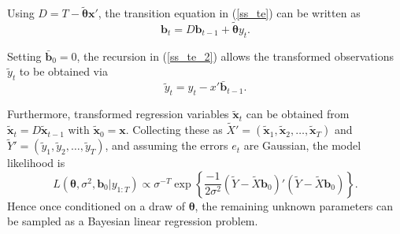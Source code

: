 \documentclass[12pt,a4paper]{article}%
\numberwithin{equation}{section}
\begin{document}
Using $D = T - \tilde{\boldsymbol{\theta}} \textbf{x}'$, the transition equation in (\ref{ss_te}) can be written as 
\begin{equation}
\textbf{b}_t = D \textbf{b}_{t-1} + \tilde{\boldsymbol{\theta}} y_t \label{ss_te_2}.
\end{equation}

Setting $\bar{\textbf{b}}_0 = 0$, the recursion in (\ref{ss_te_2}) allows the transformed observations $\tilde{y}_t$ to be obtained via
\begin{equation}
\tilde{y}_t = y_t - x'\bar{\textbf{b}}_{t-1} \label{ss_rp_y}.
\end{equation}

Furthermore, transformed regression variables $\tilde{\textbf{x}}_t$ can be obtained from $\tilde{\textbf{x}}_t = D\tilde{\textbf{x}}_{t-1}$ with $\tilde{\textbf{x}}_0 = \textbf{x}$. Collecting these as $\widetilde{X}' = (\tilde{\textbf{x}}_1, \tilde{\textbf{x}}_2, \dots, \tilde{\textbf{x}}_T)$ and $\widetilde{Y}' = (\tilde{y}_1, \tilde{y}_2, \dots, \tilde{y}_T)$, and assuming the errors $e_t$ are Gaussian, the model likelihood is
\begin{equation}
L(\boldsymbol{\theta}, \sigma^2, \boldsymbol{b}_0 | y_{1:T}) \propto \sigma^{-T} \exp \left\{ \frac{-1}{2\sigma^2}(\widetilde{Y} - \widetilde{X}\boldsymbol{b}_0)'(\widetilde{Y} - \widetilde{X}\boldsymbol{b}_0) \right\}.
\end{equation}
Hence once conditioned on a draw of $\boldsymbol{\theta}$, the remaining unknown parameters can be sampled as a Bayesian linear regression problem.
\end{document}
